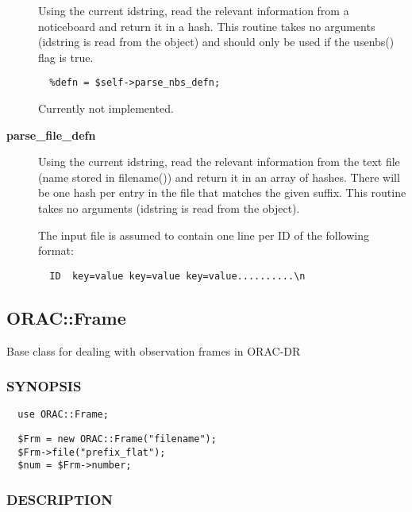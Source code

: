 \begin{description}
Using the current idstring, read the relevant information from
a noticeboard and return it in a hash. This routine takes no
arguments (idstring is read from the object) and should only
be used if the usenbs() flag is true.

\begin{verbatim}
  %defn = $self->parse_nbs_defn;
\end{verbatim}


Currently not implemented.

\item[\textbf{parse\_file\_defn}] \mbox{}

Using the current idstring, read the relevant information from
the text file (name stored in filename()) and return it in an array
of  hashes. There will be one hash per entry in the file that
matches the given suffix.
This routine takes no arguments (idstring is read from the object).



The input file is assumed to contain one line per ID of the following
format:

\begin{verbatim}
  ID  key=value key=value key=value..........\n
\end{verbatim}
\end{description}


\subsection{ORAC::Frame\label{ORAC::Frame}}

Base class for dealing with observation frames in ORAC-DR

\subsubsection*{SYNOPSIS\label{ORAC::Frame_SYNOPSIS}}\begin{verbatim}
  use ORAC::Frame;
\end{verbatim}
\begin{verbatim}
  $Frm = new ORAC::Frame("filename");
  $Frm->file("prefix_flat");
  $num = $Frm->number;
\end{verbatim}
\subsubsection*{DESCRIPTION\label{ORAC::Frame_DESCRIPTION}}

